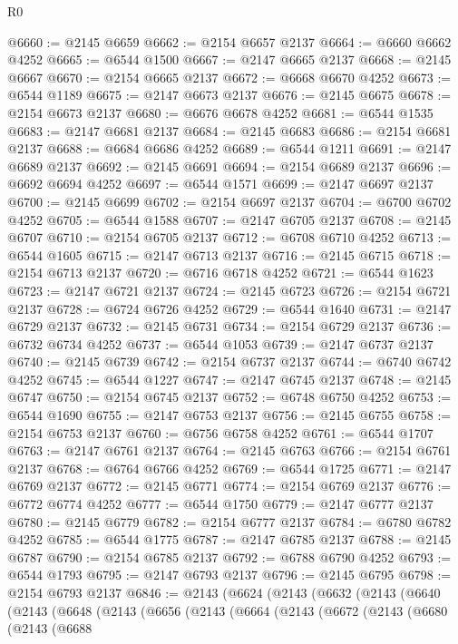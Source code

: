 \begin{lexlean}{R0}
\begin{coremodule}
@6660 := @2145 @6659
@6662 := @2154 @6657 @2137
@6664 := @6660 @6662 @4252
@6665 := @6544 @1500
@6667 := @2147 @6665 @2137
@6668 := @2145 @6667
@6670 := @2154 @6665 @2137
@6672 := @6668 @6670 @4252
@6673 := @6544 @1189
@6675 := @2147 @6673 @2137
@6676 := @2145 @6675
@6678 := @2154 @6673 @2137
@6680 := @6676 @6678 @4252
@6681 := @6544 @1535
@6683 := @2147 @6681 @2137
@6684 := @2145 @6683
@6686 := @2154 @6681 @2137
@6688 := @6684 @6686 @4252
@6689 := @6544 @1211
@6691 := @2147 @6689 @2137
@6692 := @2145 @6691
@6694 := @2154 @6689 @2137
@6696 := @6692 @6694 @4252
@6697 := @6544 @1571
@6699 := @2147 @6697 @2137
@6700 := @2145 @6699
@6702 := @2154 @6697 @2137
@6704 := @6700 @6702 @4252
@6705 := @6544 @1588
@6707 := @2147 @6705 @2137
@6708 := @2145 @6707
@6710 := @2154 @6705 @2137
@6712 := @6708 @6710 @4252
@6713 := @6544 @1605
@6715 := @2147 @6713 @2137
@6716 := @2145 @6715
@6718 := @2154 @6713 @2137
@6720 := @6716 @6718 @4252
@6721 := @6544 @1623
@6723 := @2147 @6721 @2137
@6724 := @2145 @6723
@6726 := @2154 @6721 @2137
@6728 := @6724 @6726 @4252
@6729 := @6544 @1640
@6731 := @2147 @6729 @2137
@6732 := @2145 @6731
@6734 := @2154 @6729 @2137
@6736 := @6732 @6734 @4252
@6737 := @6544 @1053
@6739 := @2147 @6737 @2137
@6740 := @2145 @6739
@6742 := @2154 @6737 @2137
@6744 := @6740 @6742 @4252
@6745 := @6544 @1227
@6747 := @2147 @6745 @2137
@6748 := @2145 @6747
@6750 := @2154 @6745 @2137
@6752 := @6748 @6750 @4252
@6753 := @6544 @1690
@6755 := @2147 @6753 @2137
@6756 := @2145 @6755
@6758 := @2154 @6753 @2137
@6760 := @6756 @6758 @4252
@6761 := @6544 @1707
@6763 := @2147 @6761 @2137
@6764 := @2145 @6763
@6766 := @2154 @6761 @2137
@6768 := @6764 @6766 @4252
@6769 := @6544 @1725
@6771 := @2147 @6769 @2137
@6772 := @2145 @6771
@6774 := @2154 @6769 @2137
@6776 := @6772 @6774 @4252
@6777 := @6544 @1750
@6779 := @2147 @6777 @2137
@6780 := @2145 @6779
@6782 := @2154 @6777 @2137
@6784 := @6780 @6782 @4252
@6785 := @6544 @1775
@6787 := @2147 @6785 @2137
@6788 := @2145 @6787
@6790 := @2154 @6785 @2137
@6792 := @6788 @6790 @4252
@6793 := @6544 @1793
@6795 := @2147 @6793 @2137
@6796 := @2145 @6795
@6798 := @2154 @6793 @2137
@6846 := @2143
    (@6624
      (@2143
        (@6632
          (@2143
            (@6640
              (@2143
                (@6648
                  (@2143
                    (@6656
                      (@2143
                        (@6664
                          (@2143
                            (@6672
                              (@2143
                                (@6680
                                  (@2143
                                    (@6688

\end{coremodule}
\end{lexlean}
